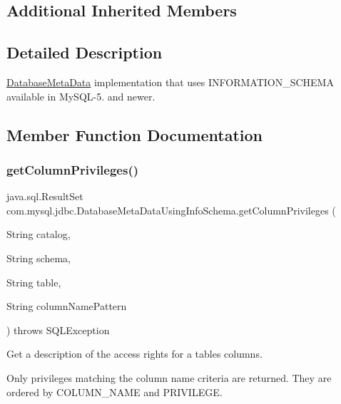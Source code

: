 \subsection*{Additional Inherited Members}


\subsection{Detailed Description}
\mbox{\hyperlink{classcom_1_1mysql_1_1jdbc_1_1_database_meta_data}{Database\+Meta\+Data}} implementation that uses I\+N\+F\+O\+R\+M\+A\+T\+I\+O\+N\+\_\+\+S\+C\+H\+E\+MA available in My\+S\+Q\+L-\/5. and newer. 

\subsection{Member Function Documentation}
\mbox{\label{classcom_1_1mysql_1_1jdbc_1_1_database_meta_data_using_info_schema_a21958250d37526385b0bfc7e0699c6bf}} 
\subsubsection{\texorpdfstring{get\+Column\+Privileges()}{getColumnPrivileges()}}
{\footnotesize\ttfamily java.\+sql.\+Result\+Set com.\+mysql.\+jdbc.\+Database\+Meta\+Data\+Using\+Info\+Schema.\+get\+Column\+Privileges (\begin{DoxyParamCaption}\item[{String}]{catalog,  }\item[{String}]{schema,  }\item[{String}]{table,  }\item[{String}]{column\+Name\+Pattern }\end{DoxyParamCaption}) throws S\+Q\+L\+Exception}

Get a description of the access rights for a table\textquotesingle{}s columns. 

Only privileges matching the column name criteria are returned. They are ordered by C\+O\+L\+U\+M\+N\+\_\+\+N\+A\+ME and P\+R\+I\+V\+I\+L\+E\+GE. 

